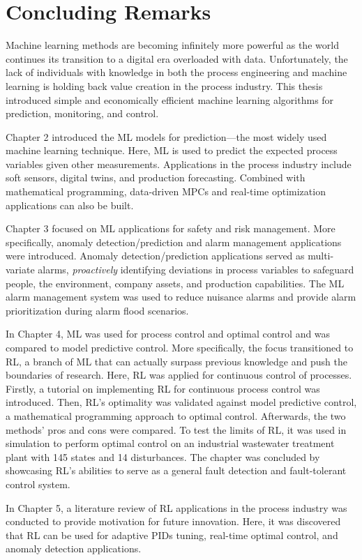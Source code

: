 \section{Concluding Remarks}
Machine learning methods are becoming infinitely more powerful as the world continues its transition to a digital era overloaded with data.  Unfortunately, the lack of individuals with knowledge in both the process engineering and machine learning is holding back value creation in the process industry.  This thesis introduced simple and economically efficient machine learning algorithms for prediction, monitoring, and control.

Chapter 2 introduced the ML models for prediction---the most widely used machine learning technique.  Here, ML is used to predict the expected process variables given other measurements.  Applications in the process industry include soft sensors, digital twins, and production forecasting.  Combined with mathematical programming, data-driven MPCs and real-time optimization applications can also be built.

Chapter 3 focused on ML applications for safety and risk management.  More specifically, anomaly detection/prediction and alarm management applications were introduced.  Anomaly detection/prediction applications served as multi-variate alarms, \textit{proactively} identifying deviations in process variables to safeguard people, the environment, company assets, and production capabilities.  The ML alarm management system was used to reduce nuisance alarms and provide alarm prioritization during alarm flood scenarios.

In Chapter 4, ML was used for process control and optimal control and was compared to model predictive control. More specifically, the focus transitioned to RL, a branch of ML that can actually surpass previous knowledge and push the boundaries of research. Here, RL was applied for continuous control of processes. Firstly, a tutorial on implementing RL for continuous process control was introduced.  Then, RL's optimality was validated against model predictive control, a mathematical programming approach to optimal control. Afterwards, the two methods' pros and cons were compared.  To test the limits of RL, it was used in simulation to perform optimal control on an industrial wastewater treatment plant with 145 states and 14 disturbances.  The chapter was concluded by showcasing RL's abilities to serve as a general fault detection and fault-tolerant control system.  

In Chapter 5, a literature review of RL applications in the process industry was conducted to provide motivation for future innovation. Here, it was discovered that RL can be used for adaptive PIDs tuning, real-time optimal control, and anomaly detection applications.

